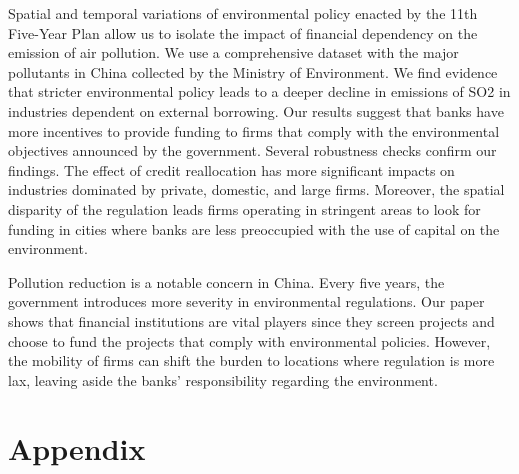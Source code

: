 \documentclass[12pt]{article}
\begin{document}
Spatial and temporal variations of environmental policy enacted by the 11th Five-Year Plan allow us to isolate the impact of financial dependency on the emission of air pollution. We use a comprehensive dataset with the major pollutants in China collected by the Ministry of Environment. We find evidence that stricter environmental policy leads to a deeper decline in emissions of SO2 in industries dependent on external borrowing. Our results suggest that banks have more incentives to provide funding to firms that comply with the environmental objectives announced by the government. Several robustness checks confirm our findings. The effect of credit reallocation has more significant impacts on industries dominated by private, domestic, and large firms. Moreover, the spatial disparity of the regulation leads firms operating in stringent areas to look for funding in cities where banks are less preoccupied with the use of capital on the environment.  

Pollution reduction is a notable concern in China. Every five years, the government introduces more severity in environmental regulations. Our paper shows that financial institutions are vital players since they screen projects and choose to fund the projects that comply with environmental policies. However, the mobility of firms can shift the burden to locations where regulation is more lax, leaving aside the banks' responsibility regarding the environment.

\singlespacing
\setlength\bibsep{0pt}
\pagebreak



\clearpage


\section*{Appendix} \label{sec:appendixa}
\end{document}
